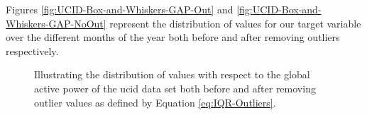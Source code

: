\begin{adjustwidth}{-1.65cm}{-0.0cm}
\begin{enumerate}[label=Step 3.\arabic*:, leftmargin=*]
    \noindent \newline Figures \ref{fig:UCID-Box-and-Whiskers-GAP-Out} and \ref{fig:UCID-Box-and-Whiskers-GAP-NoOut} represent the distribution of values for our target variable over the different months of the year both before and after removing outliers respectively.

    
    \begin{figure}[hbt!]
        \begin{adjustwidth}{-3.0cm}{-3.0cm}%
                \myfloatalign
                 \quad
                 \quad
                \caption{Illustrating the distribution of values with respect to the global active power of the \gls{ucid} data set both before and after removing outlier values as defined by Equation \ref{eq:IQR-Outliers}.}
        \end{adjustwidth}
    \end{figure}
    

\end{enumerate}
\end{adjustwidth}

